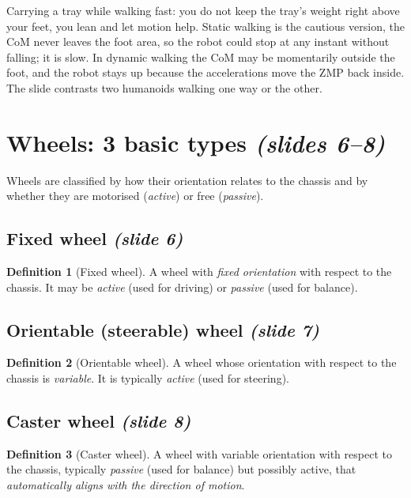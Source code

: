 \documentclass[11pt,a4paper]{article}
\theoremstyle{definition}
\newtheorem{definition}{Definition}[section]
\theoremstyle{plain}
\begin{document}
\begin{intuition}
Carrying a tray while walking fast: you do not keep the tray's weight right above your feet, you lean and let motion help. Static walking is the cautious version, the CoM never leaves the foot area, so the robot could stop at any instant without falling; it is slow. In dynamic walking the CoM may be momentarily outside the foot, and the robot stays up because the accelerations move the ZMP back inside. The slide contrasts two humanoids walking one way or the other.
\end{intuition}

\section{Wheels: 3 basic types \emph{(slides 6--8)}}

Wheels are classified by how their orientation relates to the chassis and by whether they are motorised (\emph{active}) or free (\emph{passive}).

\subsection{Fixed wheel \emph{(slide 6)}}
\begin{definition}[Fixed wheel]
A wheel with \emph{fixed orientation} with respect to the chassis. It may be \emph{active} (used for driving) or \emph{passive} (used for balance).
\end{definition}

\subsection{Orientable (steerable) wheel \emph{(slide 7)}}
\begin{definition}[Orientable wheel]
A wheel whose orientation with respect to the chassis is \emph{variable}. It is typically \emph{active} (used for steering).
\end{definition}

\subsection{Caster wheel \emph{(slide 8)}}
\begin{definition}[Caster wheel]
A wheel with variable orientation with respect to the chassis, typically \emph{passive} (used for balance) but possibly active, that \emph{automatically aligns with the direction of motion}.
\end{definition}
\end{document}
